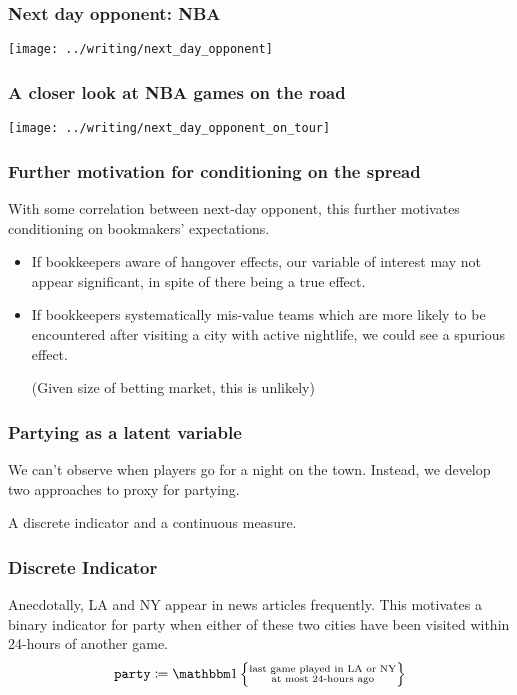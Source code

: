 \documentclass{beamer}
\begin{document}
\begin{frame}   \frametitle{Next day opponent: NBA}
  \centering \texttt{[image: ../writing/next\_day\_opponent]} \end{frame}

\begin{frame}   \frametitle{A closer look at NBA games on the road}
  \centering \texttt{[image: ../writing/next\_day\_opponent\_on\_tour]} \end{frame}

\begin{frame}   \frametitle{Further motivation for conditioning on the spread}
  \begin{block}{With some correlation between next-day opponent, this further motivates conditioning
  on bookmakers' expectations.}
  \begin{itemize}     \item If bookkeepers aware of hangover effects, our variable of interest may not appear significant, in spite of there being a true effect.

    \item If bookkeepers systematically mis-value teams which are more likely to be encountered after visiting a city with active nightlife, we could see a spurious effect.

      (Given size of betting market, this is unlikely)
    \end{itemize}   \end{block}
\end{frame}

\begin{frame}   \frametitle{Partying as a latent variable}
  \begin{block}{We can't observe when players go for a night on the town.}
    Instead, we develop two approaches to proxy for partying. 

    A discrete indicator and a continuous measure.
  \end{block} \end{frame}

\begin{frame}   \frametitle{Discrete Indicator}
  \begin{block}{Anecdotally, LA and NY appear in news articles frequently.}     \vspace{12pt}This motivates a binary indicator for party when either of these two cities have been visited within 24-hours of another game.
\vspace{12pt}
    \[
      \texttt{party} \coloneqq \mathbbm 1 \left \{\substack{\textrm{last game played in LA or NY} \\ \textrm{at most 24-hours ago}}\right \}
    \]   \end{block} \end{frame}
\end{document}

